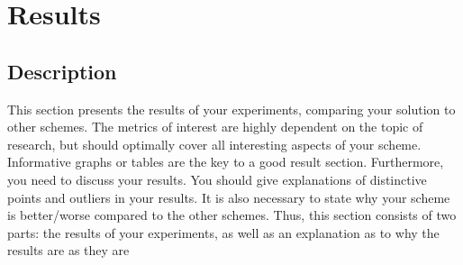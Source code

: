 \section{Results}
\subsection{Description}
This section presents the results of your experiments,
comparing your solution to other schemes. The metrics of
interest are highly dependent on the topic of research, but
should optimally cover all interesting aspects of your scheme.
Informative graphs or tables are the key to a good result
section.
Furthermore, you need to discuss your results. You should
give explanations of distinctive points and outliers in your
results. It is also necessary to state why your scheme is
better/worse compared to the other schemes. Thus, this section
consists of two parts: the results of your experiments, as well
as an explanation as to why the results are as they are

